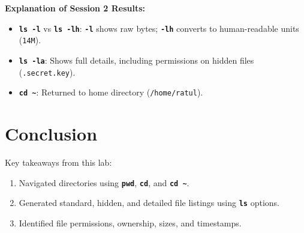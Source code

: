 \documentclass[10pt,a4paper,portrait]{article}
\newcommand{\cmd}[1]{\texttt{\textbf{#1}}}
\begin{document}
\vspace{2pt}\noindent\textbf{Explanation of Session 2 Results:}\par\vspace{1pt}
\begin{itemize}[noitemsep,topsep=1pt,leftmargin=1.2em]
  \item \cmd{ls -l} vs \cmd{ls -lh}: \cmd{-l} shows raw bytes; \cmd{-lh} converts to human-readable units (\texttt{14M}).
  \item \cmd{ls -la}: Shows full details, including permissions on hidden files (\texttt{.secret.key}).
  \item \cmd{cd \textasciitilde}: Returned to home directory (\texttt{/home/ratul}).
\end{itemize}

\section{Conclusion}
Key takeaways from this lab:
\begin{enumerate}[noitemsep,topsep=1pt,leftmargin=1.4em]
  \item Navigated directories using \cmd{pwd}, \cmd{cd}, and \cmd{cd \textasciitilde}.
  \item Generated standard, hidden, and detailed file listings using \cmd{ls} options.
  \item Identified file permissions, ownership, sizes, and timestamps.
\end{enumerate}
\end{document}
